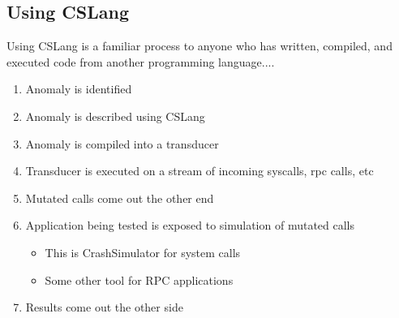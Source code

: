 \subsection{Using CSLang}

Using CSLang is a familiar process to anyone who has written, compiled, and
executed code from another programming language....

\begin{enumerate}
\item{Anomaly is identified}
\item{Anomaly is described using CSLang}
\item{Anomaly is compiled into a transducer}
\item{Transducer is executed on a stream of incoming syscalls, rpc calls, etc}
\item{Mutated calls come out the other end}
\item{Application being tested is exposed to simulation of mutated calls}
\begin{itemize}
\item{This is CrashSimulator for system calls}
\item{Some other tool for RPC applications}
\end{itemize}
\item{Results come out the other side}
\end{enumerate}
